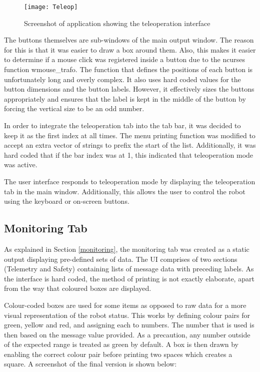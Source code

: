 \begin{figure}[t]
  \centering
  \texttt{[image: Teleop]}
  \caption{Screenshot of application showing the teleoperation interface}
  \label{fig:teleop}
\end{figure}

\newpage

The buttons themselves are sub-windows of the main output window. The reason for this is that it was easier to draw a box around them. Also, this makes it easier to determine if a mouse click was registered inside a button due to the {\selectfont ncurses} function {\selectfont wmouse}\_trafo. The function that defines the positions of each button is unfortunately long and overly complex. It also uses hard coded values for the button dimensions and the button labels. However, it effectively sizes the buttons appropriately and ensures that the label is kept in the middle of the button by forcing the vertical size to be an odd number.

In order to integrate the teleoperation tab into the tab bar, it was decided to keep it as the first index at all times. The menu printing function was modified to accept an extra vector of strings to prefix the start of the list. Additionally, it was hard coded that if the bar index was at 1, this indicated that teleoperation mode was active.

The user interface responds to teleoperation mode by displaying the teleoperation tab in the main window. Additionally, this allows the user to control the robot using the keyboard or on-screen buttons.

\subsection{Monitoring Tab}
\label{monitor_ui}

As explained in Section \ref{monitoring}, the monitoring tab was created as a static output displaying pre-defined sets of data. The UI comprises of two sections (Telemetry and Safety) containing lists of message data with preceding labels. As the interface is hard coded, the method of printing is not exactly elaborate, apart from the way that coloured boxes are displayed.

Colour-coded boxes are used for some items as opposed to raw data for a more visual representation of the robot status. This works by defining colour pairs for green, yellow and red, and assigning each to numbers. The number that is used is then based on the message value provided. As a precaution, any number outside of the expected range is treated as green by default. A box is then drawn by enabling the correct colour pair before printing two spaces which creates a square. A screenshot of the final version is shown below:

